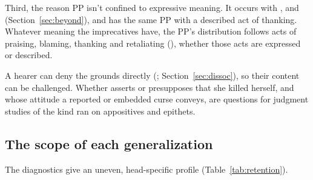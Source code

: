 \documentclass[12pt]{article}
\begin{document}
Third, the reason PP isn't confined to expressive meaning. It occurs with ,  and  (Section~\ref{sec:beyond}), and  has the same PP with a described act of thanking. Whatever meaning the imprecatives have, the PP's distribution follows acts of praising, blaming, thanking and retaliating (), whether those acts are expressed or described.

A hearer can deny the grounds directly (; Section~\ref{sec:dissoc}), so their content can be challenged. Whether  asserts or presupposes that she killed herself, and whose attitude a reported or embedded curse conveys, are questions for judgment studies of the kind \textcite{harrispotts2009} ran on appositives and epithets.

\subsection{The scope of each generalization}
\label{sec:convergence}

The diagnostics give an uneven, head-specific profile (Table~\ref{tab:retention}).
\end{document}
